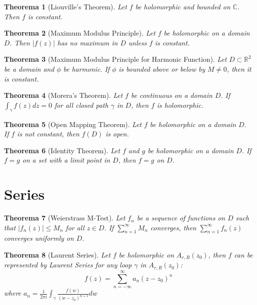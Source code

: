 \documentclass[12pt, a4paper]{article}
\newtheorem{theorem}{Theorema}[section]
\theoremstyle{definition}
\theoremstyle{remark}
\newcommand{\bb}[1]{\mathbb{#1}}
\begin{document}
\begin{theorem}[Liouville's Theorem]
	Let $f$ be holomorphic and bounded on $\bb{C}$. Then $f$ is constant.
\end{theorem}

\begin{theorem}[Maximum Modulus Principle]
	Let $f$ be holomorphic on a domain $D$. Then $|f(z)|$ has no maximum in $D$ unless $f$ is constant.
\end{theorem}

\begin{theorem}[Maximum Modulus Principle for Harmonic Function]
	Let $D \subset \bb{R}^2$ be a domain and $\phi$ be harmonic. If $\phi$ is bounded above or below by $M \neq 0$, then it is constant.
\end{theorem}
\begin{theorem}[Morera's Theorem]
	Let $f$ be continuous on a domain $D$. If $\int_{\gamma} f(z) dz = 0$ for all closed path $\gamma$ in $D$, then $f$ is holomorphic.
\end{theorem}

\begin{theorem}[Open Mapping Theorem]
	Let $f$ be holomorphic on a domain $D$. If $f$ is not constant, then $f(D)$ is open.
\end{theorem}

\begin{theorem}[Identity Theorem]
	Let $f$ and $g$ be holomorphic on a domain $D$. If $f = g$ on a set with a limit point in $D$, then $f = g$ on $D$.
\end{theorem}

\section{Series}

\begin{theorem}[Weierstrass M-Test]
	Let $f_n$ be a sequence of functions on $D$ such that $|f_n(z)| \leq M_n$ for all $z \in D$. If $\sum_{n=1}^{\infty} M_n$ converges, then $\sum_{n=1}^{\infty} f_n(z)$ converges uniformly on $D$.
\end{theorem}


\begin{theorem}[Laurent Series]
	Let $f$ be holomorphic on $A_{r,R}(z_0)$, then $f$ can be represented by Laurent Series for any loop $\gamma$ in $A_{r,R}(z_0)$:
	$$
	f(z) = \sum_{n=-\infty}^{\infty} a_n (z - z_0)^n
	$$
	where $a_n = \frac{1}{2\pi i} \int_{\gamma} \frac{f(w)}{(w - z_0)^{n+1}} dw$
\end{theorem}
\end{document}
